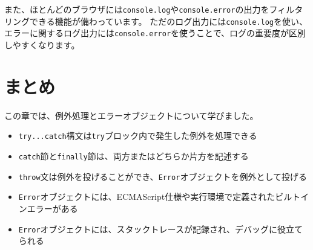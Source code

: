 また、ほとんどのブラウザには\texttt{console.log}や\texttt{console.error}の出力をフィルタリングできる機能が備わっています。
ただのログ出力には\texttt{console.log}を使い、エラーに関するログ出力には\texttt{console.error}を使うことで、ログの重要度が区別しやすくなります。

\hypertarget{conclusion}{%
\section{まとめ}\label{conclusion}}

この章では、例外処理とエラーオブジェクトについて学びました。

\begin{itemize}
\item
  \texttt{try...catch}構文は\texttt{try}ブロック内で発生した例外を処理できる
\item
  \texttt{catch}節と\texttt{finally}節は、両方またはどちらか片方を記述する
\item
  \texttt{throw}文は例外を投げることができ、\texttt{Error}オブジェクトを例外として投げる
\item
  \texttt{Error}オブジェクトには、ECMAScript仕様や実行環境で定義されたビルトインエラーがある
\item
  \texttt{Error}オブジェクトには、スタックトレースが記録され、デバッグに役立てられる
\end{itemize}
